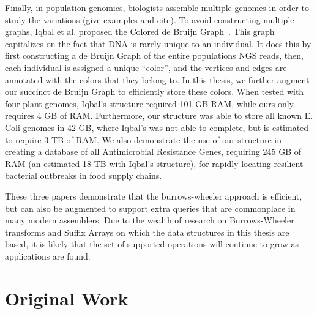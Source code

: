 Finally, in population genomics, biologists assemble multiple genomes in order to study the variations (give examples and cite). To avoid constructing multiple graphs, Iqbal et al. proposed the Colored de Bruijn Graph~\cite{ICTFM12}. This graph capitalizes on the fact that DNA is rarely unique to an individual. It does this by first constructing a de Bruijn Graph of the entire populations NGS reads, then, each individual is assigned a unique “color”, and the vertices and edges are annotated with the colors that they belong to. In this thesis, we further augment our succinct de Bruijn Graph to efficiently store these colors. When tested with four plant genomes, Iqbal’s structure required 101 GB RAM, while ours only requires 4 GB of RAM. Furthermore, our structure was able to store all known E. Coli genomes in 42 GB, where Iqbal’s was not able to complete, but is estimated to require 3 TB of RAM. We also demonstrate the use of our structure in creating a database of all Antimicrobial Resistance Genes, requiring 245 GB of RAM (an estimated 18 TB with Iqbal’s structure), for rapidly locating resilient bacterial outbreaks in food supply chains.

These three papers demonstrate that the burrows-wheeler approach is efficient, but can also be augmented to support extra queries that are commonplace in many modern assemblers. Due to the wealth of research on Burrows-Wheeler transforms and Suffix Arrays on which the data
structures in this thesis are based, it is likely that the set of supported operations will continue to grow as applications are found.

\section*{Original Work}
%
